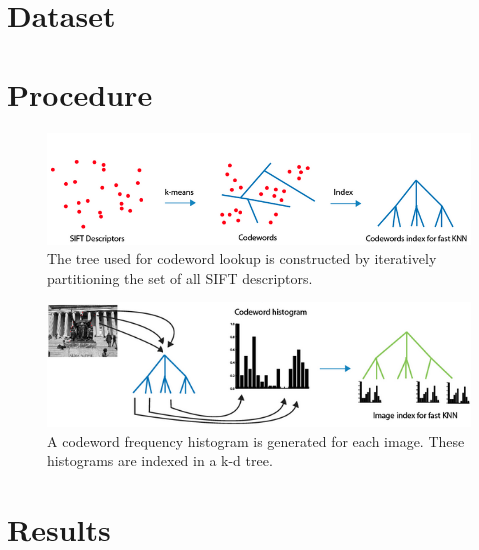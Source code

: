 \documentclass[twocolumn]{article}
\newcommand{\sectionfile}[3]{\section{#1} \label{sec:#2} }
\begin{document}
\sectionfile{Dataset}{dataset}{dataset.tex}
\sectionfile{Procedure}{procedure}{procedure.tex}
\begin{figure}
\includegraphics[width=\linewidth]{procedure1.png}
\caption{The tree used for codeword lookup is constructed by iteratively partitioning the set of all SIFT descriptors.}
\end{figure}
\begin{figure}
\includegraphics[width=\linewidth]{procedure2.png}
\caption{A codeword frequency histogram is generated for each image. These histograms are indexed in a k-d tree.}
\label{overflow}

\end{figure}
\sectionfile{Results}{results}{results.tex}
\end{document}
